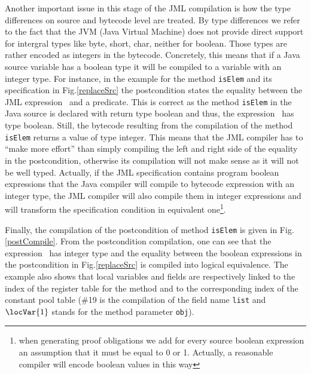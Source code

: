 \begin{enumerate}
Another important issue in this stage of the JML compilation is how the type differences on source and bytecode level are treated. 
By type differences we refer to the fact that the JVM (Java Virtual Machine) does not provide direct support for intergral types like byte, short, char, neither for boolean. Those types are rather encoded as integers in the bytecode. Concretely, this means that 
if a Java source variable has a boolean type it will be compiled to a variable with
an integer type. For instance, in the example for the method 
\texttt{isElem} and its specification in Fig.\ref{replaceSrc} the postcondition states the equality between the JML expression  
\result \ and a predicate. This is correct as the method \texttt{isElem} in the Java source is declared with return type boolean  and thus,
 the expression \result \ has type boolean. 
Still, the bytecode resulting from the compilation of the method  \texttt{isElem} returns a value of type integer. This means that the JML compiler has to 
``make more effort'' than simply compiling the left and right side of the equality in the postcondition, otherwise its compilation will not make sense as 
it will not be well typed. Actually, if the JML specification contains program boolean expressions that the Java compiler will compile to bytecode expression
 with an integer type, the JML compiler will also compile them in integer expressions and will transform the specification condition in equivalent 
one\footnote{when generating proof obligations we add for every source boolean expression an assumption that it
 must be equal to 0 or 1. Actually, a reasonable compiler will encode boolean values in this way}.  

Finally, the compilation of the postcondition of method \texttt{isElem} is given in Fig. \ref{postCompile}. From the postcondition compilation,
 one can see that the expression \result \ has integer type and the equality between the boolean expressions in the postcondition in Fig.\ref{replaceSrc} is
 compiled into logical equivalence. The example also 
shows that local variables and  fields are respectively linked to the index of the register table for the method and to the corresponding 
index of the constant pool table 
(\#19 is the compilation of the field name \texttt{list} and $\locVar{1}$ stands for the method parameter \texttt{obj}). 


\end{enumerate}
